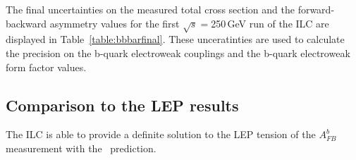 The final uncertainties on the measured total cross section and the forward-backward asymmetry values for the first $\sqrt{s}=$250\,GeV run of the ILC are displayed in Table~\ref{table:bbbarfinal}. These unceratinties are used to calculate the precision on the b-quark electroweak couplings and the b-quark electroweak form factor values.

\subsection{Comparison to the LEP results}

The ILC is able to provide a definite solution to the LEP tension of the $A_{FB}^b$ measurement with the \sm\ prediction.


